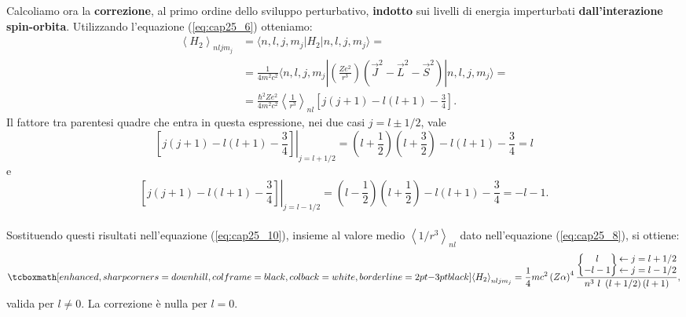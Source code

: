 \documentclass[a4paper,12pt,oneside]{book}
\begin{document}
Calcoliamo ora la \textbf{correzione}, al primo ordine dello sviluppo perturbativo, \textbf{indotto} sui livelli di energia imperturbati \textbf{dall'interazione spin-orbita}. Utilizzando l'equazione (\ref{eq:cap25_6}) otteniamo:
	\begin{align}
	\label{eq:cap25_10}
		\left< H_2 \right>_{nljm_j} &= \langle n,l,j,m_j | H_2 | n,l,j,m_j \rangle = \nonumber  \\
		& = \frac{1}{4m^2c^2} \langle n,l,j,m_j | \left( \frac{Ze^2}{r^3} \right) \left( \vec{J}^2-\vec{L}^2-\vec{S}^2 \right)      | n,l,j,m_j \rangle= \nonumber  \\
		& =  \frac{\hbar^2 Ze^2}{4m^2c^2} \left\langle \frac{1}{r^3} \right\rangle _{nl} \left[ j(j+1)-l(l+1)-\frac{3}{4}  \right] .
	\end{align}
Il fattore tra parentesi quadre che entra in questa espressione, nei due casi $j=l\pm1/2$, vale 
	\begin{equation}
		\left. \left[ j(j+1)-l(l+1)-\frac{3}{4}  \right]  \right|_{j=l+1/2}    = \left( l+\frac{1}{2} \right) \left( l+\frac{3}{2}\right)-l\left(l+1 \right) -\frac{3}{4}=l
	\end{equation}
e
	\begin{equation} 
		\left. \left[ j(j+1)-l(l+1)-\frac{3}{4}  \right] \right|_{j=l-1/2} = \left( l-\frac{1}{2} \right) \left(l+\frac{1}{2} \right)-l\left( l+1 \right) -\frac{3}{4}=-l-1 .
	\end{equation}\\
	
Sostituendo questi risultati nell'equazione (\ref{eq:cap25_10}), insieme al valore medio $\left< 1/r^3 \right>_{nl}$ dato nell'equazione (\ref{eq:cap25_8}), si ottiene:
	\begin{equation}
	\label{eq:cap25_11}
		\tcboxmath[enhanced, sharp corners=downhill, colframe=black, colback=white, borderline={2pt}{-3pt}{black}]{
		\left< H_2 \right>_{nljm_j}=\frac{1}{4}mc^2\left( Z\alpha \right)^4 \frac{\begin{Bmatrix}
		      l  \\ 
		      -l-1 
		    \end{Bmatrix}
		    \begin{matrix}
		    \leftarrow j=l+1/2 \\
		    \leftarrow j=l-1/2
		    \end{matrix} }{n^3 \ l \ \left(l+1/2 \right) \left( l+1 \right)} ,
		    }
\end{equation}
valida per $l\neq0$. La correzione è nulla per $l=0$. \\
\end{document}
